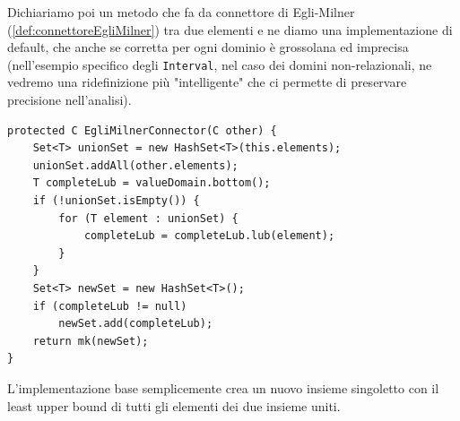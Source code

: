 Dichiariamo poi un metodo che fa da connettore di Egli-Milner (\ref{def:connettoreEgliMilner}) tra due elementi e ne diamo una implementazione di default, che anche se corretta per ogni dominio è grossolana ed imprecisa (nell'esempio specifico degli \texttt{Interval}, nel caso dei domini non-relazionali, ne vedremo una ridefinizione più "intelligente" che ci permette di preservare precisione nell'analisi).
\begin{lstlisting}[belowskip=-1.1 \baselineskip]
protected C EgliMilnerConnector(C other) {
    Set<T> unionSet = new HashSet<T>(this.elements);
    unionSet.addAll(other.elements);
    T completeLub = valueDomain.bottom();
    if (!unionSet.isEmpty()) {
        for (T element : unionSet) {
            completeLub = completeLub.lub(element);
        }
    }
    Set<T> newSet = new HashSet<T>();
    if (completeLub != null)
        newSet.add(completeLub);
    return mk(newSet);
}
\end{lstlisting}
L'implementazione base semplicemente crea un nuovo insieme singoletto con il least upper bound di tutti gli elementi dei due insieme uniti.



